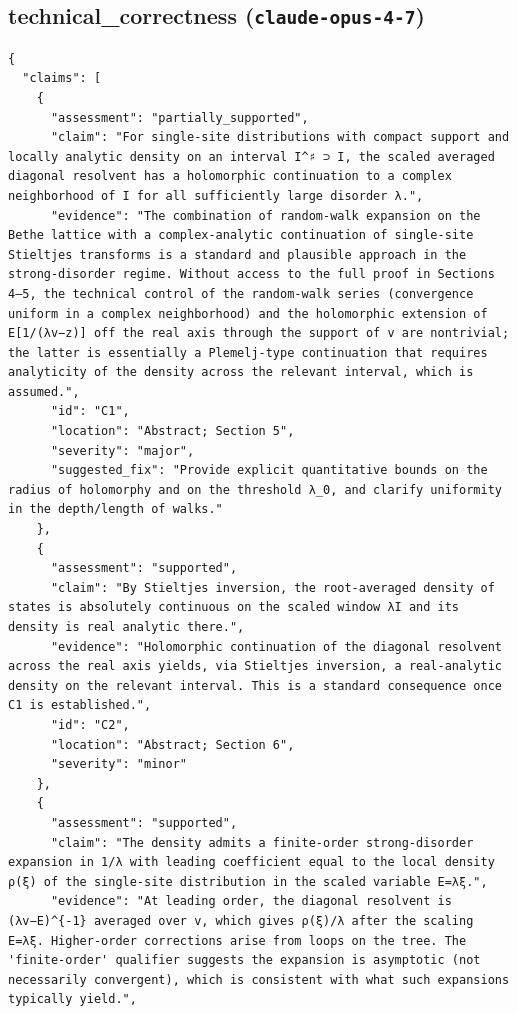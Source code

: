 \documentclass[11pt]{article}
\begin{document}
\subsection*{technical_correctness (\texttt{claude-opus-4-7})}
\begin{verbatim}
{
  "claims": [
    {
      "assessment": "partially_supported",
      "claim": "For single-site distributions with compact support and locally analytic density on an interval I^♯ ⊃ I, the scaled averaged diagonal resolvent has a holomorphic continuation to a complex neighborhood of I for all sufficiently large disorder λ.",
      "evidence": "The combination of random-walk expansion on the Bethe lattice with a complex-analytic continuation of single-site Stieltjes transforms is a standard and plausible approach in the strong-disorder regime. Without access to the full proof in Sections 4–5, the technical control of the random-walk series (convergence uniform in a complex neighborhood) and the holomorphic extension of E[1/(λv−z)] off the real axis through the support of v are nontrivial; the latter is essentially a Plemelj-type continuation that requires analyticity of the density across the relevant interval, which is assumed.",
      "id": "C1",
      "location": "Abstract; Section 5",
      "severity": "major",
      "suggested_fix": "Provide explicit quantitative bounds on the radius of holomorphy and on the threshold λ_0, and clarify uniformity in the depth/length of walks."
    },
    {
      "assessment": "supported",
      "claim": "By Stieltjes inversion, the root-averaged density of states is absolutely continuous on the scaled window λI and its density is real analytic there.",
      "evidence": "Holomorphic continuation of the diagonal resolvent across the real axis yields, via Stieltjes inversion, a real-analytic density on the relevant interval. This is a standard consequence once C1 is established.",
      "id": "C2",
      "location": "Abstract; Section 6",
      "severity": "minor"
    },
    {
      "assessment": "supported",
      "claim": "The density admits a finite-order strong-disorder expansion in 1/λ with leading coefficient equal to the local density ρ(ξ) of the single-site distribution in the scaled variable E=λξ.",
      "evidence": "At leading order, the diagonal resolvent is (λv−E)^{-1} averaged over v, which gives ρ(ξ)/λ after the scaling E=λξ. Higher-order corrections arise from loops on the tree. The 'finite-order' qualifier suggests the expansion is asymptotic (not necessarily convergent), which is consistent with what such expansions typically yield.",

\end{verbatim}
\end{document}
